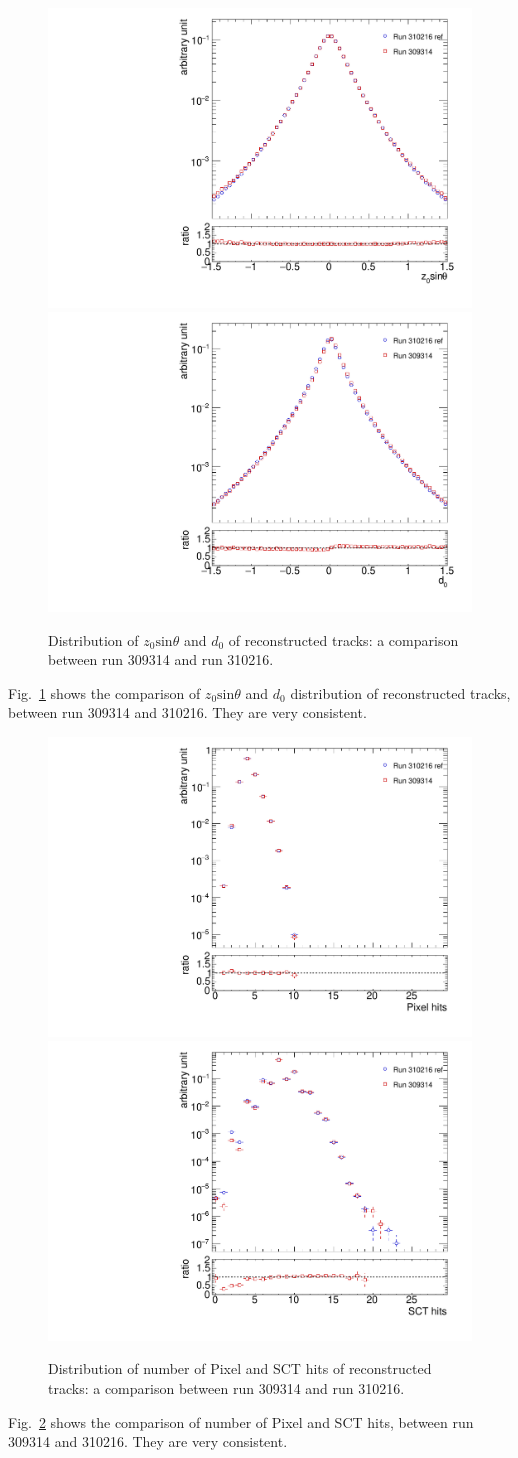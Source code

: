 \begin{figure}[H]
\centering
\includegraphics[width=0.45\linewidth]{figs/sec_evtSlc/GRLpp2016/309314_dis_z0.pdf}
\includegraphics[width=0.45\linewidth]{figs/sec_evtSlc/GRLpp2016/309314_dis_d0.pdf}
\caption{Distribution of $z_{0}\text{sin}\theta$ and $d_{0}$ of reconstructed tracks: a comparison between run 309314 and run 310216.}
\label{fig:GRLpp2016_309314_z0_d0}
\end{figure}
Fig.~\ref{fig:GRLpp2016_309314_z0_d0} shows the comparison of $z_{0}\text{sin}\theta$ and $d_{0}$ distribution of reconstructed tracks, between run 309314 and 310216. They are very consistent.

\begin{figure}[H]
\centering
\includegraphics[width=0.45\linewidth]{figs/sec_evtSlc/GRLpp2016/309314_dis_pixHit.pdf}
\includegraphics[width=0.45\linewidth]{figs/sec_evtSlc/GRLpp2016/309314_dis_sctHit.pdf}
\caption{Distribution of number of Pixel and SCT hits of reconstructed tracks: a comparison between run 309314 and run 310216.}
\label{fig:GRLpp2016_309314_pixHit_sctHit}
\end{figure}
Fig.~\ref{fig:GRLpp2016_309314_pixHit_sctHit} shows the comparison of number of Pixel and SCT hits, between run 309314 and 310216. They are very consistent.

